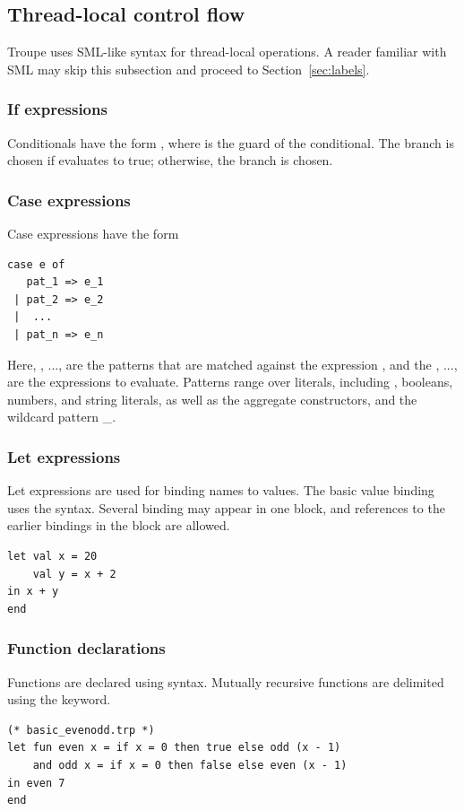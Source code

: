 \subsection{Thread-local control flow}
Troupe uses SML-like syntax for thread-local operations. A reader familiar
with SML may skip this subsection and proceed to  Section~\ref{sec:labels}.

\subsubsection{If expressions}
Conditionals have the form , where  is the guard of the conditional. 
The branch  is chosen if  evaluates to true; otherwise, the branch  is chosen.

\subsubsection{Case expressions}
Case expressions have the form
\begin{lstlisting}
case e of 
   pat_1 => e_1
 | pat_2 => e_2 
 |  ...
 | pat_n => e_n
\end{lstlisting}
Here, , ...,  are the patterns that are matched against the expression , and the , ...,  are the 
expressions to evaluate. Patterns range over literals, including \textcode{()}, booleans, numbers, and string literals, as well as the 
aggregate constructors, and the wildcard pattern \_.



\subsubsection{Let expressions}
Let expressions are used for binding names to values. The basic value binding uses the  syntax. 
Several binding may appear in one block, and references to the earlier bindings in the block are allowed. 
\begin{lstlisting}
let val x = 20
    val y = x + 2
in x + y
end  
\end{lstlisting}


\subsubsection{Function declarations}
\label{sec:letfun}
Functions are declared using  syntax. Mutually recursive functions 
are delimited using the  keyword.
\begin{lstlisting}
(* basic_evenodd.trp *)
let fun even x = if x = 0 then true else odd (x - 1)
    and odd x = if x = 0 then false else even (x - 1)
in even 7
end    
\end{lstlisting}

